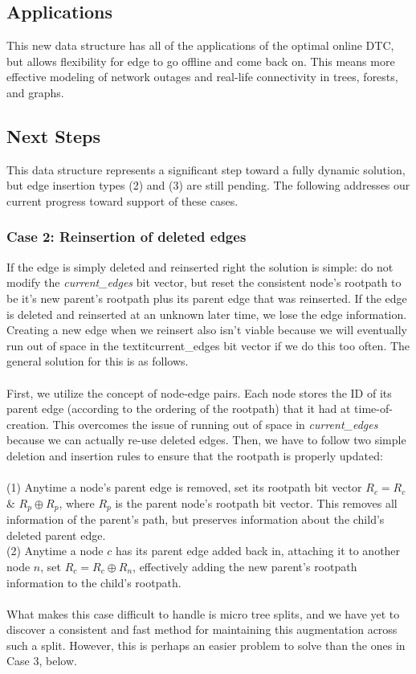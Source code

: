 \documentclass{article}
\begin{document}
\subsection{Applications}
This new data structure has all of the applications of the optimal online DTC, but allows flexibility for edge to go offline and come back on. This means more effective modeling of network outages and real-life connectivity in trees, forests, and graphs.

\subsection{Next Steps}
This data structure represents a significant step toward a fully dynamic solution, but edge insertion types (2) and (3) are still pending. The following addresses our current progress toward support of these cases.

\subsubsection{Case 2: Reinsertion of deleted edges}
If the edge is simply deleted and reinserted right the solution is simple: do not modify the \textit{current\_edges} bit vector, but reset the consistent node's rootpath to be it's new parent's rootpath plus its parent edge that was reinserted. If the edge is deleted and reinserted at an unknown later time, we lose the edge information. Creating a new edge when we reinsert also isn't viable because we will eventually run out of space in the textit{current\_edges} bit vector if we do this too often. The general solution for this is as follows. \\ \\
First, we utilize the concept of node-edge pairs. Each node stores the ID of its parent edge (according to the ordering of the rootpath) that it had at time-of-creation. This overcomes the issue of running out of space in \textit{current\_edges} because we can actually re-use deleted edges.
Then, we have to follow two simple deletion and insertion rules to ensure that the rootpath is properly updated: \\ \\
(1) Anytime a node's parent edge is removed, set its rootpath bit vector $R_c = R_c$ $\&$ $R_p \oplus R_p$, where $R_p$ is the parent node's rootpath bit vector. This removes all information of the parent's path, but preserves information about the child's deleted parent edge. \\
(2) Anytime a node $c$ has its parent edge added back in, attaching it to another node $n$, set $R_c = R_c \oplus R_n$, effectively adding the new parent's rootpath information to the child's rootpath. \\ \\
What makes this case difficult to handle is micro tree splits, and we have yet to discover a consistent and fast method for maintaining this augmentation across such a split. However, this is perhaps an easier problem to solve than the ones in Case 3, below.
\end{document}
